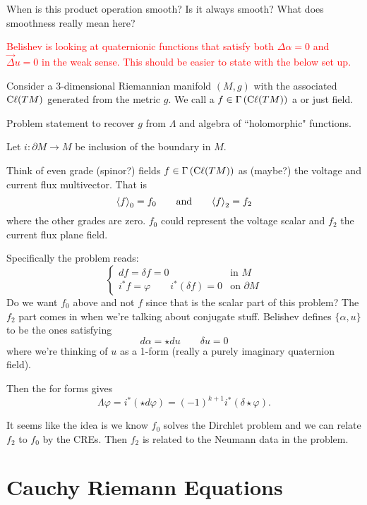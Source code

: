 \begin{question}
When is this product operation smooth? Is it always smooth? What does smoothness really mean here?
\end{question}

\textcolor{red}{Belishev is looking at quaternionic functions that satisfy both $\Delta \alpha=0$ and $\vec{\Delta}u=0$ in the weak sense. This should be easier to state with the below set up.}

Consider a $3$-dimensional Riemannian manifold $(M,g)$ with the associated  $\mathrm{C}\ell(TM)$ generated from the metric $g$. We call a $f\in \Gamma\left(\mathrm{C}\ell(TM)\right)$ a  or just field.  

\begin{problem}
Problem statement to recover $g$ from $\Lambda$ and algebra of ``holomorphic" functions.
\end{problem}

Let $i\colon \partial M \to M$ be inclusion of the boundary in $M$.


Think of even grade (spinor?) fields $f\in \Gamma\left(\mathrm{C}\ell(TM)\right)$ as (maybe?) the voltage and current flux multivector. That is
\[
\projzero{f} = f_0 \qquad \textrm{and} \qquad \projtwo{f}=f_2
\]
where the other grades are zero. $f_0$ could represent the voltage scalar and $f_2$ the current flux plane field.

Specifically the problem reads:
\[
\begin{cases}
df=\delta f = 0 &\textrm{in $M$}\\
i^* f = \varphi \qquad i^*(\delta f)=0 & \textrm{on $\partial M$}
\end{cases}
\]
Do we want $f_0$ above and not $f$ since that is the scalar part of this problem? The $f_2$ part comes in when we're talking about conjugate stuff. Belishev defines  $\{\alpha,u\}$ to be the ones satisfying 
\[
d\alpha = \star d u \qquad \delta u=0
\]
where we're thinking of $u$ as a 1-form (really a purely imaginary quaternion field).

Then the  for forms gives
\[
\Lambda \varphi = i^*(\star d \varphi) = (-1)^{k+1}i^*(\delta \star \varphi).
\]

It seems like the idea is we know $f_0$ solves the Dirchlet problem and we can relate $f_2$ to $f_0$ by the CREs. Then $f_2$ is related to the Neumann data in the problem.

\section{Cauchy Riemann Equations}

